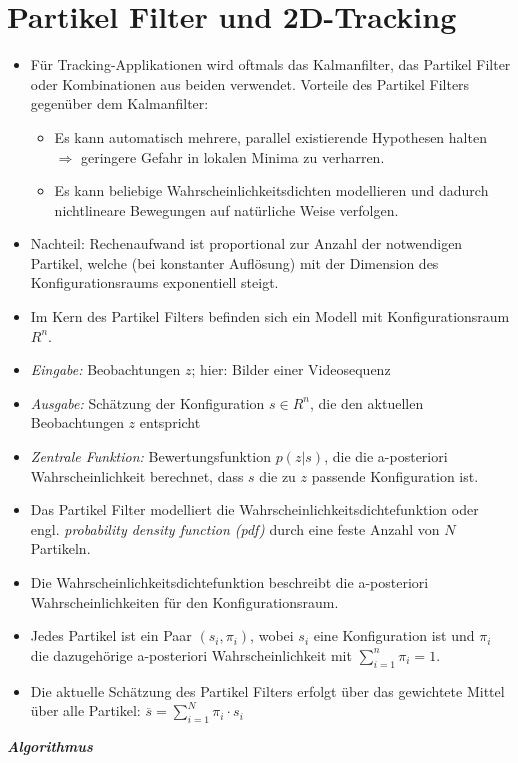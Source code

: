 \section{Partikel Filter und 2D-Tracking}
\begin{itemize}
\item Für Tracking-Applikationen wird oftmals das Kalmanfilter, das Partikel Filter oder Kombinationen aus beiden verwendet. Vorteile des Partikel Filters gegenüber dem Kalmanfilter:
\begin{itemize}
\item Es kann automatisch mehrere, parallel existierende Hypothesen halten $\Rightarrow$ geringere Gefahr in lokalen Minima zu verharren.
\item Es kann beliebige Wahrscheinlichkeitsdichten modellieren und dadurch nichtlineare Bewegungen auf natürliche Weise verfolgen.
\end{itemize}
\item Nachteil: Rechenaufwand ist proportional zur Anzahl der notwendigen Partikel, welche (bei konstanter Auflösung) mit der Dimension des Konfigurationsraums exponentiell steigt. 
\item Im Kern des Partikel Filters befinden sich ein Modell mit Konfigurationsraum $R^n$. 
\item \textit{Eingabe:} Beobachtungen $z$; hier: Bilder einer Videosequenz
\item \textit{Ausgabe:} Schätzung der Konfiguration $s \in R^n$, die den aktuellen Beobachtungen $z$ entspricht \item \textit{Zentrale Funktion:} Bewertungsfunktion $p(z|s)$, die die a-posteriori Wahrscheinlichkeit berechnet, dass $s$ die zu $z$ passende Konfiguration ist.
\item Das Partikel Filter modelliert die Wahrscheinlichkeitsdichtefunktion oder engl. \textsl{probability density function (pdf)} durch eine feste Anzahl von $N$ Partikeln. 
\item Die Wahrscheinlichkeitsdichtefunktion beschreibt die a-posteriori Wahrscheinlichkeiten für den Konfigurationsraum. 
\item Jedes Partikel ist ein Paar $(s_i, \pi_i)$, wobei $s_i$ eine Konfiguration ist und $\pi_i$ die dazugehörige a-posteriori Wahrscheinlichkeit mit $\sum_{i=1}^n \pi_i = 1$. 
\item Die aktuelle Schätzung des Partikel Filters erfolgt über das gewichtete Mittel über alle Partikel: $\overline{s} = \sum\limits_{i=1}^{N} \pi_i \cdot s_i$
\end{itemize}
\textbf{\textsl{Algorithmus}}

